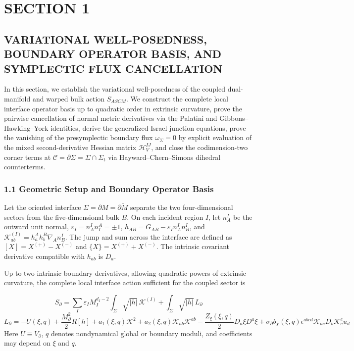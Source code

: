 \documentclass[aps,prd,onecolumn,superscriptaddress,nofootinbib,longbibliography,10pt]{revtex4-2}
\begin{document}
  
\section*{SECTION 1}

  
\subsection*{VARIATIONAL WELL-POSEDNESS, BOUNDARY OPERATOR BASIS, AND SYMPLECTIC FLUX CANCELLATION}

  In this section, we establish the variational well-posedness of the coupled dual-manifold and warped bulk action \(S_{ASCM}\). We construct the complete local interface operator basis up to quadratic order in extrinsic curvature, prove the pairwise cancellation of normal metric derivatives via the Palatini and Gibbons–Hawking–York identities, derive the generalized Israel junction equations, prove the vanishing of the presymplectic boundary flux \(\omega_\Sigma = 0\) by explicit evaluation of the mixed second-derivative Hessian matrix \(\mathcal{H}_V^{IJ}\), and close the codimension-two corner terms at \(\mathcal{C} = \partial\Sigma = \Sigma \cap \Sigma_t\) via Hayward–Chern–Simons dihedral counterterms.


  
  
\subsubsection*{1.1 Geometric Setup and Boundary Operator Basis}

  Let the oriented interface \(\Sigma = \partial M = \partial\tilde{M}\) separate the two four-dimensional sectors from the five-dimensional bulk \(B\). On each incident region \(I\), let \(n^I_A\) be the outward unit normal, \(\varepsilon_I = n^I_A n_I^A = \pm 1\), \(h_{AB} = G_{AB} - \varepsilon_I n^I_A n^I_B\), and \(\mathcal{K}^{(I)}_{ab} = h^A_a h^B_b \nabla_A n^I_B\). The jump and sum across the interface are defined as \([X] = X^{(+)} - X^{(-)}\) and \(\{X\} = X^{(+)} + X^{(-)}\). The intrinsic covariant derivative compatible with \(h_{ab}\) is \(D_a\).


  Up to two intrinsic boundary derivatives, allowing quadratic powers of extrinsic curvature, the complete local interface action sufficient for the coupled sector is


  \[ S_\partial = \sum_I \varepsilon_I M_I^{d_I - 2} \int_\Sigma \sqrt{|h|}\, \mathcal{K}^{(I)} + \int_\Sigma \sqrt{|h|}\, L_\partial \]
  \[ L_\partial = -U(\xi, q) + \frac{M_\partial^2}{2}R[h] + a_1(\xi, q)\mathcal{K}^2 + a_2(\xi, q)\mathcal{K}_{ab}\mathcal{K}^{ab} - \frac{Z_\xi(\xi, q)}{2}D_a\xi D^a\xi + \sigma_\partial b_\chi(\xi, q)\epsilon^{abcd}\mathcal{K}_{ae} D_b \mathcal{K}^e_c u_d \]
  Here \(U \equiv V_\partial\), \(q\) denotes nondynamical global or boundary moduli, and coefficients may depend on \(\xi\) and \(q\).
\end{document}
